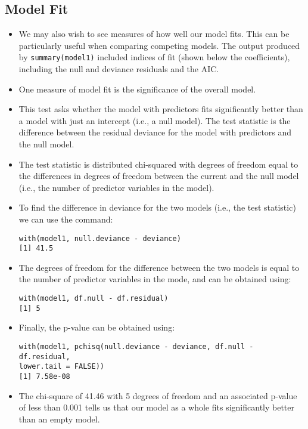 \subsection{Model Fit}
\begin{itemize}
\item We may also wish to see measures of how well our model fits. This can be particularly useful when comparing competing models. The output produced by \texttt{summary(model1)} included indices of fit (shown below the coefficients), including the null and deviance residuals and the AIC. 
\item One measure of model fit is the significance of the overall model. 
\item This test asks whether the model with predictors fits significantly better than a model with just an intercept (i.e., a null model). The test statistic is the difference between the residual deviance for the model with predictors and the null model. 
\item The test statistic is distributed chi-squared with degrees of freedom equal to the differences in degrees of freedom between the current and the null model (i.e., the number of predictor variables in the model). 
\item To find the difference in deviance for the two models (i.e., the test statistic) we can use the command:

\begin{framed}
\begin{verbatim}
with(model1, null.deviance - deviance)
[1] 41.5
\end{verbatim}
\end{framed}
\item The degrees of freedom for the difference between the two models is equal to the number of predictor variables in the mode, and can be obtained using:
\begin{framed}
\begin{verbatim}
with(model1, df.null - df.residual)
[1] 5
\end{verbatim}
\end{framed}
\item Finally, the p-value can be obtained using:
\begin{framed}
\begin{verbatim}
with(model1, pchisq(null.deviance - deviance, df.null - df.residual, 
lower.tail = FALSE))
[1] 7.58e-08
\end{verbatim}
\end{framed}


\item The chi-square of 41.46 with 5 degrees of freedom and an associated p-value of less than 0.001 tells us that our model as a whole fits significantly better than an empty model. 
\end{itemize}

